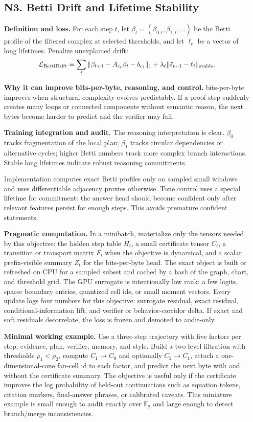 \documentclass[10pt]{article}
\newcommand{\FF}{\mathbb{F}}
\newcommand{\loss}{\mathcal{L}}
\numberwithin{equation}{section}
\begin{document}
\subsection{N3. Betti Drift and Lifetime Stability}
\noindent\textbf{Definition and loss.} For each step $t$, let $\beta_t=(\beta_{0,t},\beta_{1,t},\ldots)$ be the Betti profile of the filtered complex at selected thresholds, and let $\ell_t$ be a vector of long lifetimes. Penalize unexplained drift:
\[
\loss_{\rm BettiDrift}=\sum_t\|\beta_{t+1}-A_{c_t}\beta_t-b_{c_t}\|_1+\lambda_\ell\|\ell_{t+1}-\ell_t\|_{\rm stable}.
\]

\noindent\textbf{Why it can improve bits-per-byte, reasoning, and control.} bits-per-byte improves when structural complexity evolves predictably. If a proof step suddenly creates many loops or connected components without semantic reason, the next bytes become harder to predict and the verifier may fail.

\noindent\textbf{Training integration and audit.} The reasoning interpretation is clear. $\beta_0$ tracks fragmentation of the local plan; $\beta_1$ tracks circular dependencies or alternative cycles; higher Betti numbers track more complex branch interactions. Stable long lifetimes indicate robust reasoning commitments.

Implementation computes exact Betti profiles only on sampled small windows and uses differentiable adjacency proxies otherwise. Tone control uses a special lifetime for commitment: the answer head should become confident only after relevant features persist for enough steps. This avoids premature confident statements.

\noindent\textbf{Pragmatic computation.} In a minibatch, materialize only the tensors needed by this objective: the hidden step table $H_t$, a small certificate tensor $C_t$, a transition or transport matrix $F_t$ when the objective is dynamical, and a scalar prefix-visible summary $Z_t$ for the bits-per-byte head. The exact object is built or refreshed on CPU for a sampled subset and cached by a hash of the graph, chart, and threshold grid. The GPU surrogate is intentionally low rank: a few logits, sparse boundary entries, quantized cell ids, or small moment vectors. Every update logs four numbers for this objective: surrogate residual, exact residual, conditional-information lift, and verifier or behavior-corridor delta. If exact and soft residuals decorrelate, the loss is frozen and demoted to audit-only.

\noindent\textbf{Minimal working example.} Use a three-step trajectory with five factors per step: evidence, plan, verifier, memory, and style. Build a two-level filtration with thresholds $\rho_1<\rho_2$, compute $C_1\to C_0$ and optionally $C_2\to C_1$, attach a one-dimensional-cone fan-cell id to each factor, and predict the next byte with and without the certificate summary. The objective is useful only if the certificate improves the log probability of held-out continuations such as equation tokens, citation markers, final-answer phrases, or calibrated caveats. This miniature example is small enough to audit exactly over $\FF_2$ and large enough to detect branch/merge inconsistencies.
\end{document}
